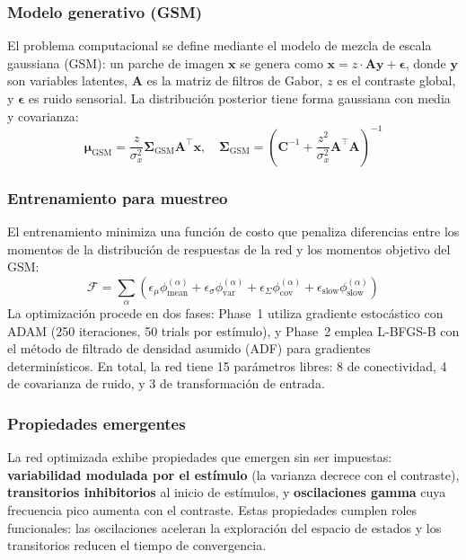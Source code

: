 \documentclass[spanish,a4paper,11pt]{article}
\begin{document}
\subsubsection{Modelo generativo (GSM)}

El problema computacional se define mediante el modelo de mezcla de escala gaussiana (GSM): un parche de imagen $\mathbf{x}$ se genera como $\mathbf{x} = z \cdot \mathbf{A}\mathbf{y} + \boldsymbol{\epsilon}$, donde $\mathbf{y}$ son variables latentes, $\mathbf{A}$ es la matriz de filtros de Gabor, $z$ es el contraste global, y $\boldsymbol{\epsilon}$ es ruido sensorial. La distribución posterior tiene forma gaussiana con media y covarianza:
\begin{equation}
\boldsymbol{\mu}_{\text{GSM}} = \frac{z}{\sigma_x^2} \boldsymbol{\Sigma}_{\text{GSM}} \mathbf{A}^\top \mathbf{x}, \quad
\boldsymbol{\Sigma}_{\text{GSM}} = \left( \mathbf{C}^{-1} + \frac{z^2}{\sigma_x^2} \mathbf{A}^\top \mathbf{A} \right)^{-1}
\label{eq:gsm_posterior}
\end{equation}

\subsubsection{Entrenamiento para muestreo}

El entrenamiento minimiza una función de costo que penaliza diferencias entre los momentos de la distribución de respuestas de la red y los momentos objetivo del GSM:
\begin{equation}
\mathcal{F} = \sum_\alpha \left( \epsilon_{\mu} \phi_{\text{mean}}^{(\alpha)} + \epsilon_{\sigma} \phi_{\text{var}}^{(\alpha)} + \epsilon_{\Sigma} \phi_{\text{cov}}^{(\alpha)} + \epsilon_{\text{slow}} \phi_{\text{slow}}^{(\alpha)} \right)
\label{eq:cost}
\end{equation}
La optimización procede en dos fases: Phase~1 utiliza gradiente estocástico con ADAM (250 iteraciones, 50 trials por estímulo), y Phase~2 emplea L-BFGS-B con el método de filtrado de densidad asumido (ADF) para gradientes determinísticos. En total, la red tiene 15 parámetros libres: 8 de conectividad, 4 de covarianza de ruido, y 3 de transformación de entrada.

\subsubsection{Propiedades emergentes}

La red optimizada exhibe propiedades que emergen sin ser impuestas: \textbf{variabilidad modulada por el estímulo} (la varianza decrece con el contraste), \textbf{transitorios inhibitorios} al inicio de estímulos, y \textbf{oscilaciones gamma} cuya frecuencia pico aumenta con el contraste. Estas propiedades cumplen roles funcionales: las oscilaciones aceleran la exploración del espacio de estados y los transitorios reducen el tiempo de convergencia.
\end{document}
